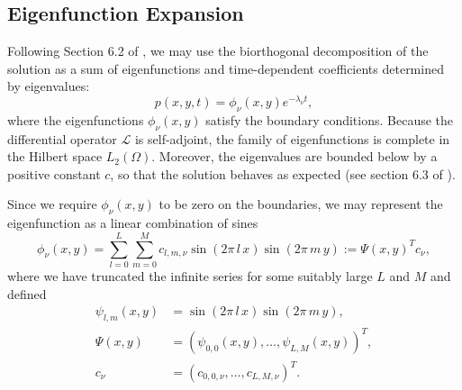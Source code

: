 \documentclass[10pt]{article}
\begin{document}
\subsection{Eigenfunction Expansion} \label{sec:eigenfunction}
Following Section 6.2 of \cite{risken1989fokker-planck}, we may use
the biorthogonal decomposition of the solution as a sum of
eigenfunctions and time-dependent coefficients determined by eigenvalues:
\begin{equation}
  p(x,y,t) = \phi_\nu(x,y) e^{-\lambda_\nu t}, \label{eq:biorthogonal}
\end{equation}
where the eigenfunctions $\phi_\nu(x, y)$ satisfy the boundary
conditions. Because the differential operator $\mathcal{L}$ is
self-adjoint, the family of eigenfunctions is complete in the Hilbert
space $L_2(\Omega)$. Moreover, the eigenvalues are bounded below by a
positive constant $c$, so that the solution behaves as expected (see
section 6.3 of \cite{risken1989fokker-planck}).

Since we require $\phi_\nu(x,y)$ to be zero on the boundaries, we
may represent the eigenfunction as a linear combination of sines
\[
  \phi_\nu(x,y) = \sum_{l=0}^L \sum_{m=0}^M c_{l,m, \nu}
  \sin\left(2\pi\, l\, x \right) \sin\left(2\pi\, m\, y \right) := \Psi(x,y)^T c_\nu,
\]
where we have truncated the infinite series for some suitably large
$L$ and $M$ and defined
\begin{align*}
  \psi_{l,m}(x,y) &= \sin\left(2\pi\, l\, x \right)
                         \sin\left(2\pi\, m\, y \right), \\
  \Psi(x,y) &= (\psi_{0,0}(x,y), \ldots, \psi_{L,M}(x,y))^T, \\
  c_\nu &= (c_{0,0,\nu}, \ldots, c_{L,M,\nu})^T.
\end{align*}
\end{document}
